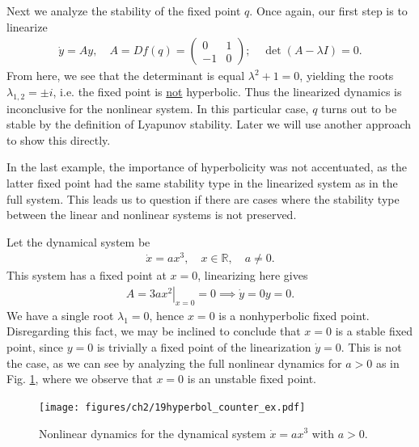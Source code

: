 \begin{ex}
Next we analyze the stability of the fixed point $q$. Once again, our first step is to linearize
\begin{align}
	\dot{y} = Ay, \quad A = Df(q) = 
	\begin{pmatrix}
		0 & 1 \\ -1 & 0
	\end{pmatrix}
	;\quad \det (A- \lambda I) = 0.
\end{align}
From here, we see that the determinant is equal $\lambda^2 + 1 = 0$, yielding the roots $\lambda_{1,2}= \pm i$, i.e. the fixed point is \underline{not} hyperbolic. Thus the linearized dynamics is inconclusive for the nonlinear system. In this particular case, $q$ turns out to be stable by the definition of Lyapunov stability. Later we will use another approach to show this directly.
\end{ex}

In the last example, the importance of hyperbolicity was not accentuated, as the latter fixed point had the same stability type in the linearized system as in the full system. This leads us to question if there are cases where the stability type between the linear and nonlinear systems is not preserved.

\begin{ex}
	Let the dynamical system be
	\begin{align}
		\dot{x} = ax^3,\quad x\in\mathbb{R},\quad a \neq 0.
	\end{align}
	This system has a fixed point at $x=0$, linearizing here gives
	\begin{align}
		A = \left. 3ax^2 \right|_{x=0} = 0 \implies \dot{y}= 0y = 0.
	\end{align}
	We have a single root $\lambda_1 = 0$, hence $x=0$ is a nonhyperbolic fixed point. Disregarding this fact, we may be inclined to conclude that $x=0$ is a stable fixed point, since $y=0$ is trivially a fixed point of the linearization $\dot{y}=0$. This is not the case, as we can see by analyzing the full nonlinear dynamics for $a>0$ as in Fig. \ref{fig:hyperbol_counter_ex}, where we observe that $x=0$ is an unstable fixed point.
\begin{figure}[h!]
	\centering
	\texttt{[image: figures/ch2/19hyperbol\_counter\_ex.pdf]}
	\caption{Nonlinear dynamics for the dynamical system $\dot{x}= ax^3$ with $a>0$.}
	\label{fig:hyperbol_counter_ex}
\end{figure}
\end{ex}


